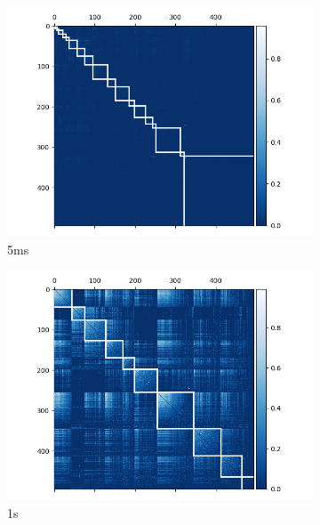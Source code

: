  \begin{figure}[p]
    \begin{subfigure}[h]{0.5\linewidth}
      \includegraphics[width=\linewidth]{figures/eight_probe/Krebs_0p005_rectified_cons_cluster_map.png}
      \caption{5ms}
      \label{fig:consensus_cluster_5ms}
    \end{subfigure}
    \begin{subfigure}[h]{0.5\linewidth}
      \includegraphics[width=\linewidth]{figures/eight_probe/Krebs_1p0_rectified_cons_cluster_map.png}
      \caption{1s}
      \label{fig:consensus_cluster_1s}
    \end{subfigure}
    \begin{subfigure}[h]{0.5\linewidth}

\end{subfigure}
\end{figure}
